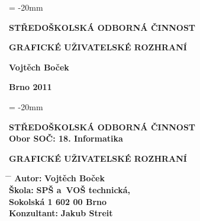 \documentclass[12pt, a4paper, oneside]{article}
\newcommand{\B}{\textbf} %
\begin{document}

\pagestyle{empty} %
 
\voffset = -20mm %
\enlargethispage{60mm} %

\begin{center}
 
\Large \B{STŘEDOŠKOLSKÁ ODBORNÁ ČINNOST}

\vspace{60mm}

\huge %
\B{GRAFICKÉ UŽIVATELSKÉ ROZHRANÍ} 

\Large

\vspace{90mm}


\B{Vojtěch Boček} \\

\vspace{40mm}

\B{Brno 2011}


\end{center}

\newpage %

\voffset = -20mm %
\enlargethispage{60mm} %

\begin{center}

\Large \B{STŘEDOŠKOLSKÁ ODBORNÁ ČINNOST}  \\
\vspace{10mm}
 \normalsize 
\B{Obor SOČ: 18. Informatika}%

\vspace{45mm}

\LARGE %
\B{GRAFICKÉ UŽIVATELSKÉ ROZHRANÍ} 
\end{center}  
\large

\vspace{50mm}


\begin{tabbing}
\hspace{10mm} \= \hspace{30mm}  \=   \kill %
  \> \B{Autor:}  \> \B{Vojtěch Boček}        \\[8mm] 
  \> \B{Škola:}   \> \B{SPŠ a~VOŠ technická, }     \\
  \>              \> \B{Sokolská 1 602 00 Brno}    \\[8mm]

  \> \B{Konzultant:} \> \B {Jakub Streit} 
\end{tabbing}
\end{document}

